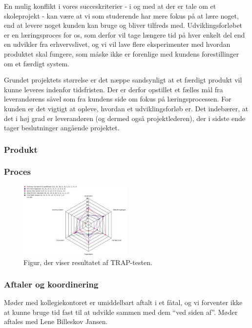 \documentclass[12pt, a4paper]{report}
\begin{document}
En mulig konflikt i vores succeskriterier - i og med at der er tale om et skoleprojekt - kan være at vi som studerende har mere fokus på at lære noget, end at levere noget kunden kan bruge og bliver tilfreds med. Udviklingsforløbet er en læringsproces for os, som derfor vil tage længere tid på hver enkelt del end en udvikler fra erhvervslivet, og vi vil lave flere eksperimenter med hvordan produktet skal fungere, som måske ikke er forenlige med kundens forestillinger om et færdigt system.

Grundet projektets størrelse er det næppe sandsynligt at et færdigt produkt vil kunne leveres indenfor tidsfristen. Der er derfor opstillet et fælles mål fra leverandørens såvel som fra kundens side om fokus på læringsprocessen. For kunden er det vigtigt at opleve, hvordan et udviklingsforløb er. Det indebærer, at det i høj grad er leverandøren (og dermed også projektlederen), der i sidste ende tager beslutninger angående projektet.


\subsubsection{Produkt}

\subsubsection{Proces}

\begin{figure}[ht!]
\includegraphics[width=0.5\textwidth]{itsaTRAP}
\caption{Figur, der viser resultatet af TRAP-testen.}
\label{trap}
\end{figure}

\subsubsection{Aftaler og koordinering}
Møder med kollegiekontoret er umiddelbart aftalt i et fåtal, og vi forventer ikke at kunne bruge tid fast til at udvikle sammen med dem “ved siden af”. Møder aftales med Lene Billeskov Jansen.
\end{document}
